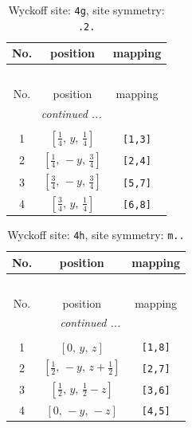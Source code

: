 \documentclass[fleqn,8pt]{jsarticle}
\begin{document}
\renewcommand{\arraystretch}{1.2}
\begin{longtable}{ccc}
\caption{Wyckoff site: {\tt 4g}, site symmetry: {\tt .2.}}
 \\
 \hline \hline
No. & position & mapping \\ \hline \endfirsthead

\multicolumn{2}{l}{\tablename\ \thetable{}} \\
 \hline \hline
No. & position & mapping \\ \hline \endhead

 \hline \hline
\multicolumn{2}{r}{\footnotesize\it continued ...} \\ \endfoot

 \hline \hline
\multicolumn{2}{r}{} \\ \endlastfoot

1 & $\left[ \frac{1}{4},\, y,\, \frac{1}{4} \right]$ & {\tt [1,3]} \\ \hline
2 & $\left[ \frac{1}{4},\, - y,\, \frac{3}{4} \right]$ & {\tt [2,4]} \\ \hline
3 & $\left[ \frac{3}{4},\, - y,\, \frac{3}{4} \right]$ & {\tt [5,7]} \\ \hline
4 & $\left[ \frac{3}{4},\, y,\, \frac{1}{4} \right]$ & {\tt [6,8]} \\
\end{longtable}
\renewcommand{\arraystretch}{1.2}
\begin{longtable}{ccc}
\caption{Wyckoff site: {\tt 4h}, site symmetry: {\tt m..}}
 \\
 \hline \hline
No. & position & mapping \\ \hline \endfirsthead

\multicolumn{2}{l}{\tablename\ \thetable{}} \\
 \hline \hline
No. & position & mapping \\ \hline \endhead

 \hline \hline
\multicolumn{2}{r}{\footnotesize\it continued ...} \\ \endfoot

 \hline \hline
\multicolumn{2}{r}{} \\ \endlastfoot

1 & $\left[ 0,\, y,\, z \right]$ & {\tt [1,8]} \\ \hline
2 & $\left[ \frac{1}{2},\, - y,\, z + \frac{1}{2} \right]$ & {\tt [2,7]} \\ \hline
3 & $\left[ \frac{1}{2},\, y,\, \frac{1}{2} - z \right]$ & {\tt [3,6]} \\ \hline
4 & $\left[ 0,\, - y,\, - z \right]$ & {\tt [4,5]} \\
\end{longtable}
\end{document}
